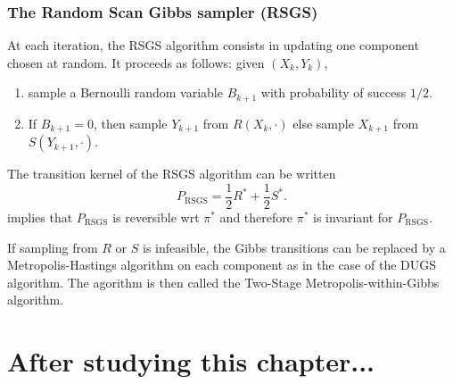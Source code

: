 \documentclass[english,graybox,envcountchap,envcountsame,sectrefs,shortlabels]{svmono}
\theoremstyle{style}
\newcommand{\eqsp}{}
\begin{document}
\subsubsection*{The Random Scan Gibbs sampler (RSGS)}
 
At each iteration, the RSGS algorithm consists in updating one component chosen at random. It
proceeds as follows: given $(X_k,Y_k)$,
\begin{enumerate}[label=(RSGS\arabic*)]
\item \label{item:rsgs-gibbs-0} sample a Bernoulli random variable $B_{k+1}$ with probability of
  success $1/2$.
\item \label{item:rsgs-gibbs-1} If $B_{k+1}= 0$, then sample $Y_{k+1}$ from $R(X_k,\cdot)$ else
  sample $X_{k+1}$ from $S(Y_{k+1},\cdot)$.
\end{enumerate}
The transition kernel of the RSGS algorithm can be written
\begin{equation}
  \label{eq:kernel:RSGS}
  P_{\mathrm{RSGS}}= \frac{1}{2} R^* + \frac{1}{2} S^* \eqsp.
\end{equation}
 implies that $P_{\mathrm{RSGS}}$ is reversible wrt
$\pi^*$ and therefore  $\pi^*$ is invariant for $P_{\mathrm{RSGS}}$.

If sampling from $R$ or $S$ is infeasible, the Gibbs transitions can be replaced by a
Metropolis-Hastings algorithm on each component as in the case of the DUGS algorithm. The agorithm
is then called the Two-Stage Metropolis-within-Gibbs algorithm.


\section{After studying this chapter...}
\begin{center}
\end{center}
\end{document}

